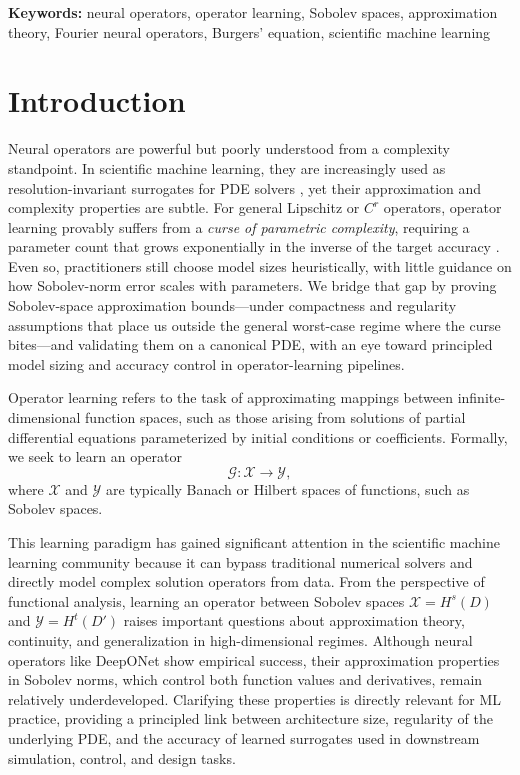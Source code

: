 \documentclass[11pt]{article}
\theoremstyle{plain}
\theoremstyle{definition}
\theoremstyle{remark}
\begin{document}
\medskip
\noindent\textbf{Keywords:} neural operators, operator learning, Sobolev spaces, approximation theory, Fourier neural operators, Burgers' equation, scientific machine learning

\section{Introduction}
Neural operators are powerful but poorly understood from a complexity standpoint. In scientific machine learning, they are increasingly used as resolution-invariant surrogates for PDE solvers \citep{li2020fourier}, yet
their approximation and complexity properties are subtle. For general Lipschitz or $C^r$ operators, operator learning provably suffers from a
\emph{curse of parametric complexity}, requiring a parameter count that grows exponentially in the inverse of the target accuracy
\citep{lanthaler2026parametric, kovachki2024data}. Even so, practitioners still choose model sizes heuristically, with little guidance on how Sobolev-norm error scales with parameters. We bridge that gap by proving Sobolev-space approximation bounds---under compactness and regularity assumptions that place us outside the general worst-case regime where the
curse bites---and validating them on a canonical PDE, with an eye toward principled model sizing and accuracy control in operator-learning pipelines.

Operator learning refers to the task of approximating mappings between infinite-dimensional function spaces, such as those arising from solutions of partial differential equations parameterized by initial conditions or coefficients. Formally, we seek to learn an operator
\[
\mathcal{G}: \mathcal{X} \to \mathcal{Y},
\]
where $\mathcal{X}$ and $\mathcal{Y}$ are typically Banach or Hilbert spaces of functions, such as Sobolev spaces.

This learning paradigm has gained significant attention in the scientific machine learning community because it can bypass traditional numerical solvers and directly model complex solution operators from data. From the
perspective of functional analysis, learning an operator between Sobolev spaces $\mathcal{X} = H^s(D)$ and $\mathcal{Y} = H^t(D')$ raises important questions about approximation theory, continuity, and generalization in
high-dimensional regimes. Although neural operators like DeepONet \citep{lu2021learning} show empirical success, their approximation properties in Sobolev norms, which control both function values and derivatives, remain
relatively underdeveloped. Clarifying these properties is directly relevant for ML practice, providing a principled link between architecture size, regularity of the underlying PDE, and the accuracy of learned surrogates used in downstream simulation, control, and design tasks.
\end{document}
